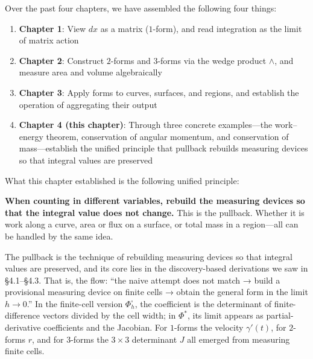 \documentclass[a4paper,12pt,openany]{book}
\providecommand{\tightlist}{%
  \setlength{\itemsep}{0pt}\setlength{\parskip}{0pt}}
\begin{document}
Over the past four chapters, we have assembled the following four
things:

\begin{enumerate}
\def\labelenumi{\arabic{enumi}.}
\tightlist
\item
  \textbf{Chapter 1}: View \(dx\) as a matrix (\(1\)-form), and read
  integration as the limit of matrix action
\item
  \textbf{Chapter 2}: Construct \(2\)-forms and \(3\)-forms via the
  wedge product \(\wedge\), and measure area and volume algebraically
\item
  \textbf{Chapter 3}: Apply forms to curves, surfaces, and regions, and
  establish the operation of aggregating their output
\item
  \textbf{Chapter 4 (this chapter)}: Through three concrete
  examples—the work–energy theorem, conservation of angular momentum,
  and conservation of mass—establish the unified principle that
  pullback rebuilds measuring devices so that integral values are
  preserved
\end{enumerate}

What this chapter established is the following unified principle:

\textbf{When counting in different variables, rebuild the measuring devices so that the integral value does not change.}
This is the pullback. Whether it is work along a curve, area or flux on
a surface, or total mass in a region—all can be handled by the same
idea.

The pullback is the technique of rebuilding measuring devices so that
integral values are preserved, and its core lies in the discovery-based
derivations we saw in §4.1–§4.3. That is, the flow: ``the naive attempt
does not match → build a provisional measuring device on finite cells →
obtain the general form in the limit \(h\to0\).'' In the finite-cell
version \(\Phi_h^\square\), the coefficient is the determinant of
finite-difference vectors divided by the cell width; in \(\Phi^*\), its
limit appears as partial-derivative coefficients and the Jacobian. For
\(1\)-forms the velocity \(\gamma'(t)\), for \(2\)-forms \(r\), and for
\(3\)-forms the \(3\times3\) determinant \(J\) all emerged from
measuring finite cells.
\end{document}
